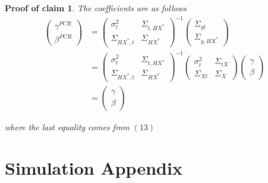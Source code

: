 \documentclass[10pt]{article}
\newtheorem{claimproof}{Proof of claim}[claim]
\begin{document}
        \begin{claimproof}
        The coefficients are as follows
                \begin{align}
                    \left(\begin{array}{l}
                {\gamma}^{PCR} \\
                {\beta}^{PCR}
                \end{array}\right)&=\left(\begin{array}{cc}
                {\sigma}^2_{t} & \Sigma_{t,HX^*} \\
                \Sigma_{HX^*,t} & {\Sigma}_{HX^*}
                \end{array}\right)^{-1}\left(\begin{array}{c}
                \Sigma_{yt} \\
                \Sigma_{y,HX^*}
                \end{array}\right)\\
                &=\left(\begin{array}{cc}
                {\sigma}^2_{t} & \Sigma_{t,HX^*} \\
                \Sigma_{HX^*,t} & {\Sigma}_{HX^*}
                \end{array}\right)^{-1}\left(\begin{array}{cc}
                {\sigma}^2_{t} & \Sigma_{tX} \\
                \Sigma_{Xt} & {\Sigma}_{X}
                \end{array}\right)\left(\begin{array}{l}
                {\gamma} \\
                {\beta}
                \end{array}\right)\\
                &=\left(\begin{array}{l}
                {\gamma} \\
                {\beta}
                \end{array}\right)
                \end{align}
                
                where the last equality comes from $(13)$
        \end{claimproof}

\clearpage

    \section*{Simulation Appendix}
\end{document}
